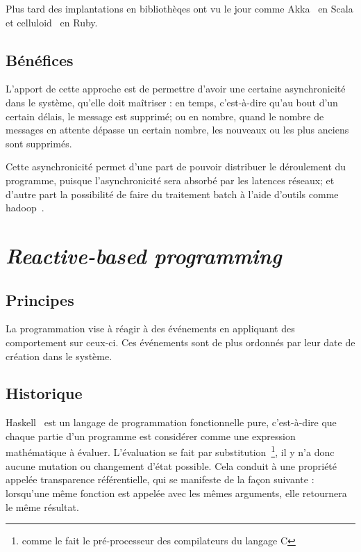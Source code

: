 \documentclass{article}
\begin{document}
Plus tard des implantations en bibliothèqes ont vu le jour comme Akka~\cite{akka}
en Scala et celluloid~\cite{celluloid} en Ruby.

\subsection{Bénéfices}\label{bénéfices}

L'apport de cette approche est de permettre d'avoir une certaine
asynchronicité dans le système, qu'elle doit maîtriser :
en temps, c'est-à-dire qu'au bout d'un certain délais, le message est supprimé;
ou en nombre, quand le nombre de messages en attente dépasse un certain nombre,
les nouveaux ou les plus anciens sont supprimés.

Cette asynchronicité permet d'une part de pouvoir distribuer le
déroulement du programme, puisque l'asynchronicité sera absorbé par les
latences réseaux; et d'autre part la possibilité de faire du traitement
batch à l'aide d'outils comme hadoop~\cite{hadoop}.

\section{\emph{Reactive-based programming}}\label{reactive}

\subsection{Principes}\label{principes-1}

La programmation vise à réagir à des événements en appliquant des
comportement sur ceux-ci. Ces événements sont de plus ordonnés par
leur date de création dans le système.

\subsection{Historique}\label{historique-1}

Haskell~\cite{haskell} est un langage de programmation fonctionnelle pure, c'est-à-dire
que chaque partie d'un programme est considérer comme une expression mathématique
à évaluer. L'évaluation se fait par substitution~\footnote{comme le fait le pré-processeur
des compilateurs du langage C}, il y n'a donc aucune mutation ou changement d'état
possible. Cela conduit à une propriété appelée transparence référentielle, qui se
manifeste de la façon suivante : lorsqu'une même fonction est appelée avec les mêmes
arguments, elle retournera le même résultat.
\end{document}
